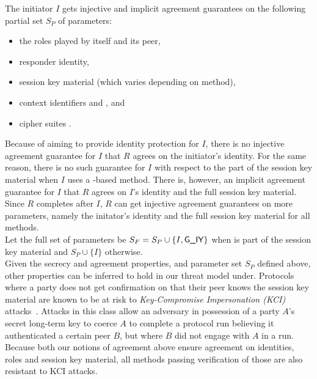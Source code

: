 %

\label{sec:agreedParams}
The initiator $I$ gets injective and implicit agreement guarantees on the
following partial set $S_P$ of parameters:
\begin{itemize}
    \item the roles played by itself and its peer,
    \item responder identity,
    \item session key material (which varies depending on \mEdhoc{} method),
    \item context identifiers \mCi{} and \mCr{}, and
    \item cipher suites \mSuites{}.
\end{itemize}
%
Because of \mEdhoc{} aiming to provide identity protection for $I$, there is no
injective agreement guarantee for $I$ that $R$ agrees on the initiator's
identity.
%
For the same reason, there is no such guarantee for $I$ with respect to
the \mGiy{} part of the session key material when $I$ uses a \mStat{}-based method.
%
There is, however, an implicit agreement guarantee for $I$ that $R$ agrees on
$I$'s identity and the full session key material.
%
Since $R$ completes after $I$, $R$ can get injective agreement guarantees on
more parameters, namely the initator's identity and the full session key
material for all methods.\\
%
Let the full set of parameters be $S_F = S_P \cup \{I, \textsf{G\_IY}\}$ when \mGiy{} is
part of the session key material and $S_P \cup \{I\}$ otherwise.\\
%

Given the secrecy and agreement properties, and parameter set $S_P$ defined
above, other properties can be inferred to hold in our threat model
under.
%
Protocols where a party does not get confirmation on that their peer knows the
session key material are known to be at risk to
\emph{Key-Compromise Impersonation (KCI)}
attacks~\cite{DBLP:conf/ima/Blake-WilsonJM97}.
%
Attacks in this class allow an adversary in possession of a party $A$'s secret
long-term key to coerce $A$ to complete a
protocol run believing it authenticated a certain peer $B$, but where $B$ did
not engage with $A$ in a run.
%
Because both our notions of agreement above ensure agreement on identities,
roles and session key material, all methods passing verification of those are
also resistant to KCI attacks.

